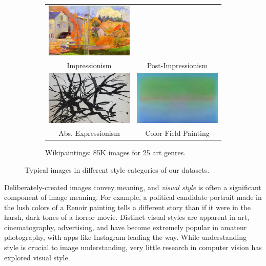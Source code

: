 \begin{figure}[t]
{\begin{subfigure}[t]{0.48\linewidth}
\begin{tabular}{cc}
        \includegraphics[width=.43\linewidth]{../style/figures/wikipaintingsDatasetExamples/used/resized/post_impressionism-0.jpg} \\
    Impressionism & Post-Impressionism \\
        \includegraphics[width=.43\linewidth]{../style/figures/wikipaintingsDatasetExamples/used/resized/abs_expressionism-0.jpg} &
    \includegraphics[width=.43\linewidth]{../style/figures/wikipaintingsDatasetExamples/used/resized/color_field-0.jpg} \\
    Abs. Expressionism & Color Field Painting \\
    \end{tabular}
    \caption{
        Wikipaintings: 85K images for 25 art genres.
    }\label{fig:wikipaintings_style_examples}
\end{subfigure}
}
\caption{
    Typical images in different style categories of our datasets.
}\label{fig:style_examples}
\end{figure}


Deliberately-created images convey meaning, and \textit{visual style} is often a significant component of image meaning.
For example, a political candidate portrait made in the lush colors of a Renoir painting tells a different story than if it were in the harsh, dark tones of a horror movie.
Distinct visual styles are apparent in art, cinematography, advertising, and have become extremely popular in amateur photography, with apps like Instagram leading the way.
While understanding style is crucial to image understanding, very little research in computer vision has explored visual style.

